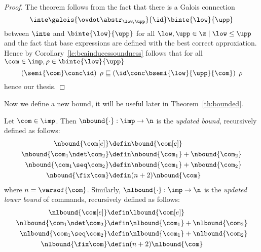\begin{proof}
  The theorem follows from the fact that there is a Galois connection
  \begin{equation*}
    \inte\galois{\ovdot\abstr_{\low, \upp}}{\id}\binte{\low}{\upp}
  \end{equation*}
  between \(\inte\) and \(\binte{\low}{\upp}\) for all
  \(\low, \upp \in \z \mid \low \leq \upp\) and the fact that base
  expressions are defined with the best correct approxiation. Hence by
  Corollary~\ref{le:bcainducessoundness} follows that for all
  \(\com\in\imp, \rho \in \binte{\low}{\upp}\)
  \begin{equation*}
    \left(\semi{\com} \conc \id \right)\;\rho \sqsubseteq  \left(\id \conc \bsemi{\low}{\upp}{\com}\right)\;\rho
  \end{equation*}
  hence our thesis.
\end{proof}

Now we define a new bound, it will be useful later in
Theorem~\ref{th:bounded}.

\begin{definition}\label{def:newbound}
  Let \(\com\in\imp\). Then \(\nbound{\cdot} : \imp \to \n\) is the
  \emph{updated bound}, recursively defined as follows:
  \begin{align*}
    \nbound{\com[e]} & \defin \bound{\com[e]} \\
    \nbound{\com_1 \ndet \com_2} & \defin \nbound{\com_1} + \nbound{\com_2} \\
    \nbound{\com_1 \seq \com_2} & \defin \nbound{\com_1} + \nbound{\com_2} \\
    \nbound{\fix\com} & \defin (n+2)\nbound{\com} \\
  \end{align*}
  where \(n = \varsof{\com}\). Similarly,
  \(\nlbound{\cdot} : \imp \to \n\) is the \emph{updated lower bound}
  of commands, recursively defined as follows:
  \begin{align*}
    \nlbound{\com[e]} & \defin \lbound{\com[e]} \\
    \nlbound{\com_1 \ndet \com_2} & \defin \nlbound{\com_1} + \nlbound{\com_2} \\
    \nlbound{\com_1 \seq \com_2} & \defin \nlbound{\com_1} + \nlbound{\com_2} \\
    \nlbound{\fix\com} & \defin (n+2)\nlbound{\com} \\
  \end{align*}
\end{definition}

